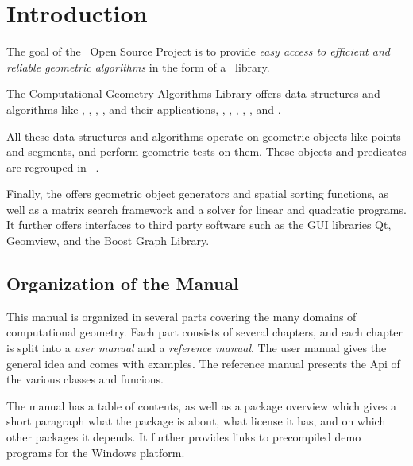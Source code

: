 
\chapter{Introduction}



The goal of the \cgal\ Open Source Project is to provide 
{\em easy access to efficient and reliable geometric algorithms}
in the form of a \CC\ library.

The Computational Geometry Algorithms Library offers data
structures and algorithms like 
,
,
,
,
 and their applications,
,
,
,
,
,
and .


All these data structures and algorithms operate on geometric objects
like points and segments, and perform geometric tests on them.
These objects and predicates are regrouped in \cgal\ .


Finally, the 
offers geometric object generators and spatial sorting functions,  
as well as a matrix search framework and a solver for linear and quadratic programs. 
It further offers interfaces to third party software such as the GUI libraries Qt, 
Geomview, and the Boost Graph Library.


\section{Organization of the Manual}

This manual is organized in several parts covering the many domains
of computational geometry. Each part consists of several chapters,
and each chapter is split into a {\em user manual}  and a {\em reference
manual}. The user manual gives the general idea and comes with examples.
The reference manual presents the {\sc Api} of the various classes
and funcions.

The manual has a table of contents, as well as a package overview
which gives a short paragraph what the package is about, what license
it has, and on which other packages it depends. It further provides
links to precompiled demo programs for the Windows platform.

